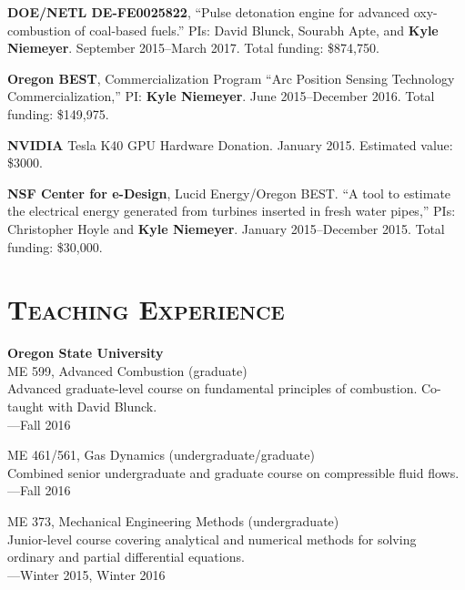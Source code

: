 \documentclass[margin,line,11pt]{res}
\newcommand*{\doi}[1]{\href{https://doi.org/#1}{\nolinkurl{https://doi.org/#1}}}
\begin{document}
\begin{resume}
\textbf{DOE\slash NETL DE-FE0025822}, ``Pulse detonation engine for advanced oxy-combustion of coal-based fuels.'' PIs: David Blunck, Sourabh Apte, and \textbf{Kyle Niemeyer}. September 2015--March 2017. Total funding: \$874,750.

\textbf{Oregon BEST}, Commercialization Program ``Arc Position Sensing Technology Commercialization,'' PI: \textbf{Kyle Niemeyer}. June 2015--December 2016. Total funding: \$149,975.

\textbf{NVIDIA} Tesla K40 GPU Hardware Donation. January 2015. Estimated value: \$3000.

\textbf{NSF Center for e-Design}, Lucid Energy\slash Oregon BEST. ``A tool to estimate the electrical energy generated from turbines inserted in fresh water pipes,'' PIs: Christopher Hoyle and \textbf{Kyle Niemeyer}. January 2015--December 2015. Total funding: \$30,000.


%
%
%

\section{\textsc{Teaching Experience}}

\textbf{Oregon State University} \\
ME 599, Advanced Combustion (graduate) \\
Advanced graduate-level course on fundamental principles of combustion. Co-taught with David Blunck.\\
---Fall 2016

ME 461\slash 561, Gas Dynamics (undergraduate\slash graduate) \\
Combined senior undergraduate and graduate course on compressible fluid flows. \\
---Fall 2016

ME 373, Mechanical Engineering Methods (undergraduate) \\
Junior-level course covering analytical and numerical methods for solving ordinary and partial differential equations. \\
---Winter 2015, Winter 2016


\end{resume}
\end{document}
